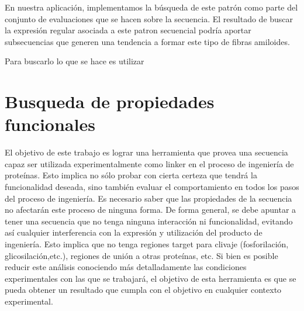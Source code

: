 
En nuestra aplicación, implementamos la búsqueda de este patrón como parte del conjunto de evaluaciones que se hacen sobre la secuencia.
El resultado de buscar la expresión regular asociada a este patron secuencial podría aportar subsecuencias que generen una tendencia a formar este tipo de fibras amiloides.

Para buscarlo lo que se hace es utilizar 























































\section{Busqueda de propiedades funcionales}



El objetivo de este trabajo es lograr una herramienta que provea una secuencia capaz ser utilizada experimentalmente como linker en el proceso de ingeniería de proteínas. 
Esto implica no sólo probar con cierta certeza que tendrá la funcionalidad deseada, sino también evaluar el comportamiento en todos los pasos del proceso de ingeniería. 
Es necesario saber que las propiedades de la secuencia no afectarán este proceso de ninguna forma.
De forma general, se debe apuntar a tener una secuencia que no tenga ninguna interacción ni funcionalidad, evitando así cualquier interferencia con la expresión y utilización del producto 
de ingeniería. Esto implica que no tenga regiones target para clivaje (fosforilación, glicosilación,etc.), regiones de unión a otras proteínas, etc.
Si bien es posible reducir este análisis conociendo más detalladamente las condiciones experimentales con las que se trabajará, el objetivo de esta herramienta es que se pueda obtener 
un resultado que cumpla con el objetivo en cualquier contexto experimental. 

